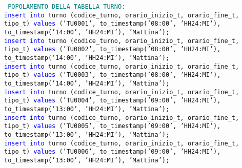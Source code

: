 \documentclass{article}
\begin{document}
    \begin{flushleft}
        \texttt{
        \textcolor{teal}{POPOLAMENTO DELLA TABELLA TURNO:} \\
        \hspace*{0.5em}\textcolor{blue}{insert into} turno (codice\_turno, orario\_inizio\_t, orario\_fine\_t, tipo\_t) \textcolor{blue}{values} \hspace*{0.5em}('TU0001', to\_timestamp('08:00', 'HH24:MI'), to\_timestamp('14:00', 'HH24:MI'), \hspace*{0.5em}'Mattina'); \\
        \hspace*{0.5em}\textcolor{blue}{insert into} turno (codice\_turno, orario\_inizio\_t, orario\_fine\_t, tipo\_t) \textcolor{blue}{values} \hspace*{0.5em}('TU0002', to\_timestamp('08:00', 'HH24:MI'), to\_timestamp('14:00', 'HH24:MI'), \hspace*{0.5em}'Mattina'); \\
        \hspace*{0.5em}\textcolor{blue}{insert into} turno (codice\_turno, orario\_inizio\_t, orario\_fine\_t, tipo\_t) \textcolor{blue}{values} \hspace*{0.5em}('TU0003', to\_timestamp('08:00', 'HH24:MI'), to\_timestamp('14:00', 'HH24:MI'), \hspace*{0.5em}'Mattina'); \\
        \hspace*{0.5em}\textcolor{blue}{insert into} turno (codice\_turno, orario\_inizio\_t, orario\_fine\_t, tipo\_t) \textcolor{blue}{values} \hspace*{0.5em}('TU0004', to\_timestamp('09:00', 'HH24:MI'), to\_timestamp('13:00', 'HH24:MI'), \hspace*{0.5em}'Mattina'); \\
        \hspace*{0.5em}\textcolor{blue}{insert into} turno (codice\_turno, orario\_inizio\_t, orario\_fine\_t, tipo\_t) \textcolor{blue}{values} \hspace*{0.5em}('TU0005', to\_timestamp('09:00', 'HH24:MI'), to\_timestamp('13:00', 'HH24:MI'), \hspace*{0.5em}'Mattina'); \\
        \hspace*{0.5em}\textcolor{blue}{insert into} turno (codice\_turno, orario\_inizio\_t, orario\_fine\_t, tipo\_t) \textcolor{blue}{values} \hspace*{0.5em}('TU0006', to\_timestamp('09:00', 'HH24:MI'), to\_timestamp('13:00', 'HH24:MI'), \hspace*{0.5em}'Mattina'); \\
}
\end{flushleft}
\end{document}
